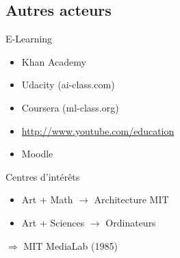 \subsection{Autres acteurs}

\begin{frame}{E-Learning}
\begin{itemize}
\item Khan Academy
\item Udacity (ai-class.com)
\item Coursera (ml-class.org)
\item \url{http://www.youtube.com/education}
\item Moodle
\end{itemize}
\end{frame}

\begin{frame}
   \pause
   \vfill
   \begin{block}{Centres d'intérêts}
     \begin{itemize}
       \item Art + Math $\rightarrow$ Architecture MIT
       \item Art + Sciences $\rightarrow$ Ordinateurs
     \end{itemize}
     $\Rightarrow$ MIT MediaLab (1985)
   \end{block}
   \vfill
\end{frame}

